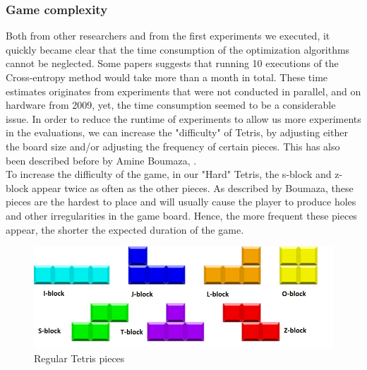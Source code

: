 \subsubsection{Game complexity \label{HardTetris}}
Both from other researchers and from the first experiments we executed, 
it quickly became clear that the time consumption of the optimization algorithms cannot be neglected.
Some papers suggests that running 10 executions of the Cross-entropy method
would take more than a month in total. These time estimates 
originates from experiments that were not conducted in parallel,
and on hardware from 2009, yet, the time consumption seemed to 
be a considerable issue.
In order to reduce the runtime of experiments 
to allow us more experiments in the evaluations, 
we can increase the "difficulty" of Tetris, by 
adjusting either the board size and/or adjusting the 
frequency of certain pieces. This has also been described 
before by Amine Boumaza, \citep{boumaza2009}.\\
To increase the difficulty of the game,
in our "Hard" Tetris, the s-block and z-block appear twice as often 
as the other pieces. As described by Boumaza, these pieces are the hardest to
place and will usually cause the player to produce holes and other irregularities
in the game board. Hence, the more frequent these pieces appear, the 
shorter the expected duration of the game.

\begin{figure}[H]
\begin{center}
\includegraphics[scale=0.6]{img/Pieces}
\end{center}
\caption{Regular Tetris pieces \label{fig:TetrisPieces}}
\end{figure}

